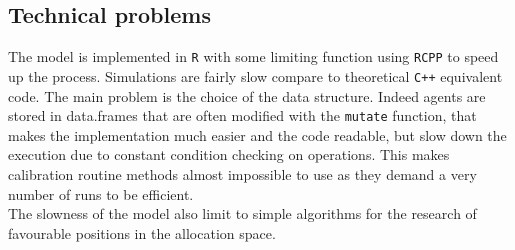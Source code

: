 \subsection{Technical problems}

The model is implemented in \texttt{R} with some limiting function using \texttt{RCPP} to speed up the process. Simulations are fairly slow compare to theoretical \texttt{C++} equivalent code. The main problem is the choice of the data structure. Indeed agents are stored in data.frames that are often modified with the \verb|mutate| function, that makes the implementation much easier and the code readable, but slow down the execution due to constant condition checking on operations. This makes calibration routine methods almost impossible to use as they demand a very number of runs to be efficient.\\
\indent The slowness of the model also limit to simple algorithms for the research of favourable positions in the allocation space.